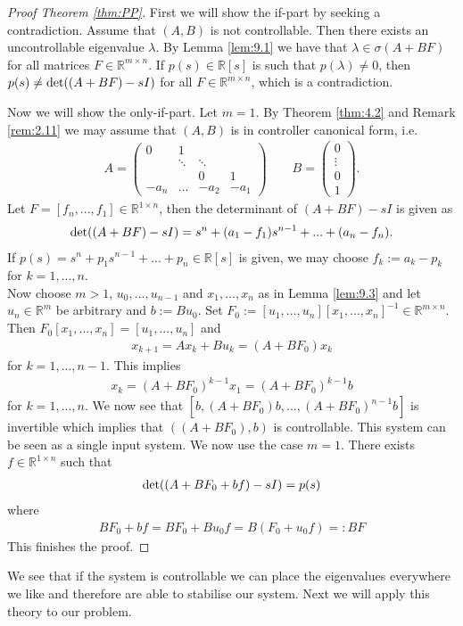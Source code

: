 \begin{proof}[Proof Theorem \ref{thm:PP}]
	First we will show the if-part by seeking a contradiction. Assume that $(A,B)$ is not controllable. Then there exists an uncontrollable eigenvalue $\lambda$. By Lemma \ref{lem:9.1} we have that $\lambda\in\sigma(A+BF) $ for all matrices $F \in \mathbb{R}^{m\times n}$. If $p(s) \in\mathbb{R}[s]$ is such that $p(\lambda)\ne 0$, then $p(s) \ne \operatorname{det}((A+BF)-sI)$ for all $F \in \mathbb{R}^{m\times n}$, which is a contradiction.

	Now we will show the only-if-part. Let $m=1$. By Theorem \ref{thm:4.2} and Remark \ref{rem:2.11} we may assume that $(A,B)$ is in controller canonical form, i.e.
	\begin{align*}
		A =
		\begin{pmatrix}
		0 & 1 &  &  \\
		& \ddots & \ddots &  \\
		&  & 0 & 1 \\
		-a_n & \dots & -a_2 & -a_1
		\end{pmatrix} \qquad
		B =
		\begin{pmatrix}
		0 \\
		\vdots \\
		0 \\
		1
		\end{pmatrix} .
	\end{align*}
Let $F = [f_n,...,f_1] \in \mathbb{R}^{1\times n}$, then the determinant of $(A+BF)-sI$ is given as
\begin{align*}
	\operatorname{det}((A+BF)-sI) = s^n+(a_1-f_1)s^{n-1}+...+(a_n-f_n).
\end{align*}
If $p(s) = s^n+p_1s^{n-1}+...+p_n \in \mathbb{R}[s]$ is given, we may choose $f_k := a_k-p_k$ for $k=1,...,n$.\\Now choose $m>1$, $u_0,...,u_{n-1}$ and $x_1,...,x_n$ as in Lemma \ref{lem:9.3} and let $u_n \in \mathbb{R}^m$ be arbitrary and $b:= Bu_0$. Set $F_0 := [u_1,...,u_n][x_1,...,x_n]^{-1} \in \mathbb{R}^{m\times n}$. Then $F_0[x_1,...,x_n] =[u_1,...,u_n]$ and
\begin{align*}
	x_{k+1} = Ax_k + Bu_k = (A+BF_0)x_k
\end{align*}
for $k=1,...,n-1$. This implies
\begin{align*}
	x_k = (A+BF_0)^{k-1}x_1 = (A+BF_0)^{k-1}b
\end{align*}
for $k=1,...,n$. We now see that $[b, (A+BF_0)b, ..., (A+BF_0)^{n-1}b]$ is invertible which implies that $((A+BF_0),b)$ is controllable. This system can be seen as a single input system. We now use the case $m=1$. There exists $f \in \mathbb{R}^{1\times n}$ such that
\begin{align*}
    \operatorname{det}((A+BF_0+bf)-sI) = p(s)
\end{align*}
where
\begin{align*}
	BF_0+bf = BF_0+Bu_0f = B(F_0+u_0f) =: BF
\end{align*}
This finishes the proof.
\end{proof}
We see that if the system is controllable we can place the eigenvalues everywhere we like and therefore are able to stabilise our system. Next we will apply this theory to our problem.


